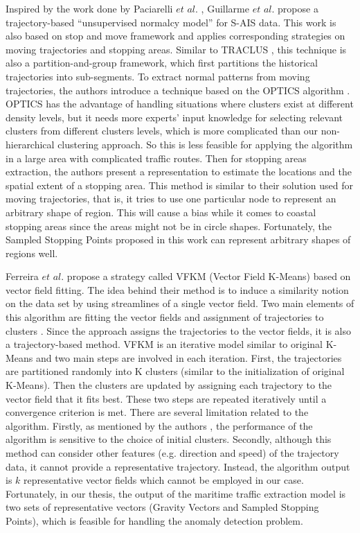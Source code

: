 \documentclass[12pt,glossary]{dalcsthesis}
\begin{document}
Inspired by the work done by Paciarelli $et$ $al$.  \cite{videosurveillance1}\cite{videosurveillance2}, Guillarme $et$ $al$. propose a trajectory-based ``unsupervised normalcy model'' \cite{Nicolas} for  S-AIS data. This work is also based on stop and move framework \cite{stopmove} and applies corresponding strategies on moving trajectories and stopping areas. Similar to TRACLUS \cite{Lee07}, this technique is also a partition-and-group framework, which first partitions the historical trajectories into sub-segments. To extract normal patterns from moving trajectories, the authors introduce a technique based on the OPTICS algorithm \cite{optics}. OPTICS has the advantage of handling situations where clusters exist at different density levels, but it needs more experts' input knowledge for selecting relevant clusters from different clusters levels, which is more complicated than our non-hierarchical clustering approach.  So this is less feasible for applying the algorithm in a large area with complicated traffic routes. Then for stopping areas extraction, the authors present a representation to estimate the locations and the spatial extent of a stopping area. This method is similar to their solution used for moving trajectories, that is, it tries to use one particular node to represent an arbitrary shape of region. This will cause a bias while it comes to coastal stopping areas since the areas might not be in circle shapes. Fortunately, the Sampled Stopping Points proposed in this work can represent arbitrary shapes of regions well.


Ferreira $et$ $al$. \cite{vfkm} propose a strategy called VFKM (Vector Field K-Means) based on vector field fitting. The idea behind their method is to induce a similarity notion on the data set by using streamlines of a single vector field. Two main elements of this algorithm are fitting the vector fields and assignment of trajectories to clusters \cite{vfkm}. Since the approach assigns the trajectories to the vector fields, it is also a trajectory-based method. VFKM is an iterative model similar to original K-Means \cite{kmeans} and two main steps are involved in each iteration. First, the trajectories are partitioned randomly into K clusters (similar to the initialization of original K-Means). Then the clusters are updated by assigning each trajectory to the vector field that it fits best. These two steps are repeated iteratively until a convergence criterion is met. There are several limitation related to the algorithm. Firstly, as mentioned by the authors \cite{vfkm}, the performance of the algorithm is sensitive to the choice of initial clusters. Secondly, although this method can consider other features (e.g. direction and speed) of the trajectory data, it cannot provide a representative trajectory. Instead, the algorithm output is $k$ representative vector fields which cannot be employed in our case. Fortunately, in our thesis, the output of the maritime traffic extraction model is two sets of representative vectors (Gravity Vectors and Sampled Stopping Points), which is feasible for handling the anomaly detection problem.
\end{document}
